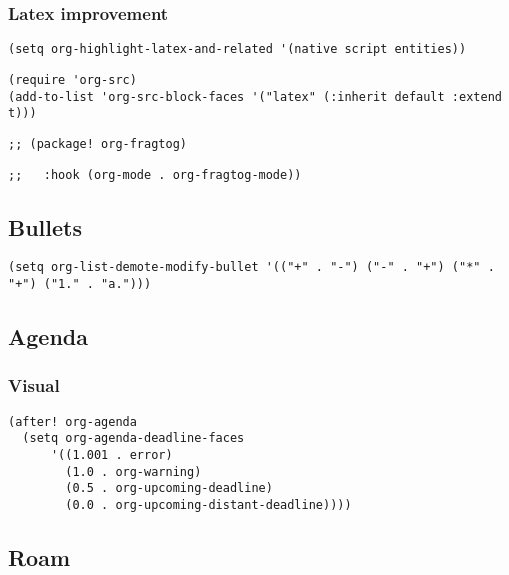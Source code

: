 \documentclass[c]{article}
\theoremstyle{plain}%
\theoremstyle{definition}
\theoremstyle{remark}
\begin{document}
\subsubsection{Latex improvement}
\label{sec:org73fa7a9}
\begin{verbatim}
(setq org-highlight-latex-and-related '(native script entities))
\end{verbatim}
\begin{verbatim}
(require 'org-src)
(add-to-list 'org-src-block-faces '("latex" (:inherit default :extend t)))
\end{verbatim}
\begin{verbatim}
;; (package! org-fragtog)
\end{verbatim}
\begin{verbatim}
;;   :hook (org-mode . org-fragtog-mode))
\end{verbatim}
\subsection{Bullets}
\label{sec:orgd2dd02c}
\begin{verbatim}
(setq org-list-demote-modify-bullet '(("+" . "-") ("-" . "+") ("*" . "+") ("1." . "a.")))
\end{verbatim}
\subsection{Agenda}
\label{sec:orga84cd5e}
\subsubsection{Visual}
\label{sec:orge1b7a84}
\begin{verbatim}
(after! org-agenda
  (setq org-agenda-deadline-faces
      '((1.001 . error)
        (1.0 . org-warning)
        (0.5 . org-upcoming-deadline)
        (0.0 . org-upcoming-distant-deadline))))
\end{verbatim}
\subsection{Roam}
\label{sec:orgb0023e1}
\end{document}
